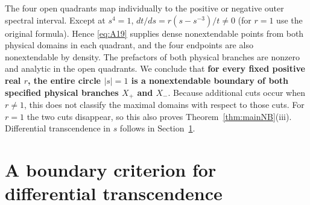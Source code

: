\documentclass[11pt,a4paper]{article}
\numberwithin{equation}{section}
\theoremstyle{plain}
\theoremstyle{definition}
\begin{document}
The four open quadrants map individually to the positive or negative outer spectral interval. Except at \(s^4=1\), \(dt/ds=r(s-s^{-3})/t\ne0\) (for \(r=1\) use the original formula). Hence \eqref{eq:A19} supplies dense nonextendable points from both physical domains in each quadrant, and the four endpoints are also nonextendable by density. The prefactors of both physical branches are nonzero and analytic in the open quadrants. We conclude that \textbf{for every fixed positive real \(r\), the entire circle \(|s|=1\) is a nonextendable boundary of both specified physical branches \(X_+\) and \(X_-\)}. Because additional cuts occur when \(r\ne1\), this does not classify the maximal domains with respect to those cuts. For $r=1$ the two cuts disappear, so this also proves Theorem~\ref{thm:mainNB}(iii). Differential transcendence in $s$ follows in Section~\ref{sec:onedt}.


\section{A boundary criterion for differential transcendence}\label{sec:onedt}
\end{document}
